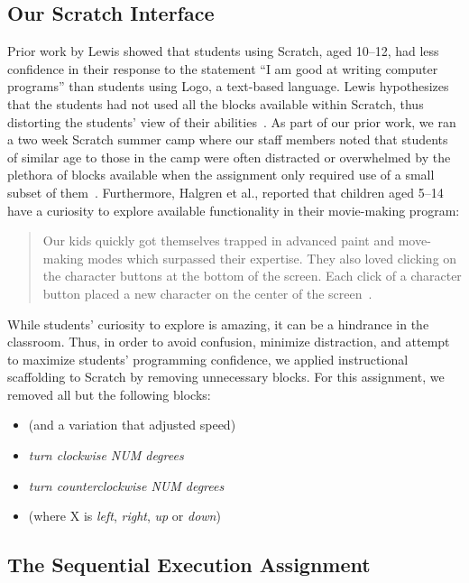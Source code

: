 \subsection{Our Scratch Interface}
Prior work by Lewis showed that students using Scratch, aged 10--12, had less
confidence in their response to the statement ``I am good at writing computer
programs'' than students using Logo, a text-based language. Lewis hypothesizes
that the students had not used all the blocks available within Scratch, thus
distorting the students' view of their
abilities~\cite{Lewis:2010:PES:1734263.1734383}. As part of our prior work, we
ran a two week Scratch summer camp where our staff members noted that students
of similar age to those in the camp were often distracted or overwhelmed by the
plethora of blocks available when the assignment only required use of a small
subset of them~\cite{Franklin:2013:SBO}. Furthermore, Halgren et al., reported
that children aged 5--14 have a curiosity to explore available functionality in
their movie-making program:

\begin{quote}Our kids quickly got themselves trapped in
advanced paint and move-making modes which surpassed their expertise. They also
loved clicking on the character buttons at the bottom of the screen. Each click
of a character button placed a new character on the center of the
screen~\cite{Halgren:1995:AAM:223904.223974}.
\end{quote}

While students' curiosity to explore is amazing, it can be a hindrance in the
classroom. Thus, in order to avoid confusion, minimize distraction, and attempt
to maximize students' programming confidence, we applied instructional
scaffolding to Scratch by removing unnecessary blocks. For this assignment, we
removed all but the following blocks:

\begin{itemize}
\item \glideDIST{} (and a variation that adjusted speed)
\item \emph{turn clockwise NUM degrees}
\item \emph{turn counterclockwise NUM degrees}
\item \pointDIR{} (where X is \emph{left}, \emph{right},
  \emph{up} or \emph{down})
\end{itemize}

\subsection{The Sequential Execution Assignment}

